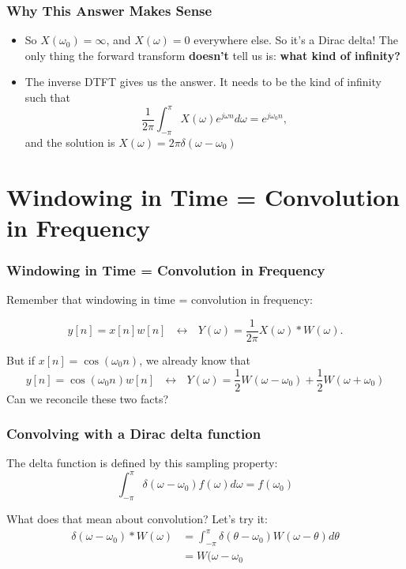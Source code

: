 \documentclass{beamer}
\begin{document}
\begin{frame}
  \frametitle{Why This Answer Makes Sense}
  \begin{itemize}
  \item So $X(\omega_0)=\infty$, and $X(\omega)=0$ everywhere else.
    So it's a Dirac delta!  The only thing the forward transform {\bf
      doesn't} tell us is: {\bf what kind of infinity?}
  \item The inverse DTFT gives us the answer.  It needs to be the kind
    of infinity such that
    \begin{displaymath}
      \frac{1}{2\pi}\int_{-\pi}^\pi X(\omega) e^{j\omega n}d\omega = e^{j\omega_0 n},
    \end{displaymath}
    and the solution is $X(\omega)=2\pi\delta(\omega-\omega_0)$
  \end{itemize}
\end{frame}

\section[Windowing]{Windowing in Time = Convolution in Frequency}
\setcounter{subsection}{1}

\begin{frame}
  \frametitle{Windowing in Time = Convolution in Frequency}

  Remember that windowing in time = convolution in frequency:

  \begin{displaymath}
    y[n]=x[n]w[n] ~~~\leftrightarrow~~~Y(\omega) = \frac{1}{2\pi} X(\omega)\ast W(\omega).
  \end{displaymath}

  But if $x[n]=\cos(\omega_0 n)$, we already know that
  \begin{displaymath}
    y[n]=\cos(\omega_0 n)w[n] ~~~\leftrightarrow~~~ Y(\omega)=
    \frac{1}{2}W(\omega-\omega_0) + \frac{1}{2}W(\omega+\omega_0)
  \end{displaymath}
  Can we reconcile these two facts?
\end{frame}

\begin{frame}
  \frametitle{Convolving with a Dirac delta function}

  The delta function is defined by this sampling property:
  \begin{displaymath}
    \int_{-\pi}^\pi \delta(\omega-\omega_0) f(\omega) d\omega = f(\omega_0)
  \end{displaymath}

  What does that mean about convolution?  Let's try it:
  \begin{align*}
    \delta(\omega-\omega_0)\ast W(\omega)
    &= \int_{-\pi}^\pi \delta(\theta-\omega_0)W(\omega-\theta)d\theta\\
    &= W(\omega-\omega_0
  \end{align*}
\end{frame}
    
\end{document}
